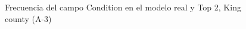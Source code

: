 \begin{figure}[H]
    \centering
    
    \caption{Frecuencia del campo Condition en el modelo real y Top 2, King county (A-3)}
    \label{frecuency-top2-condition}
\end{figure}